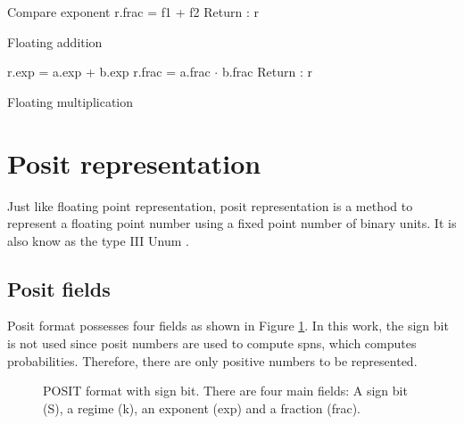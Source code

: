 \begin{algorithm}[H]
\SetAlgoLined
{}
Compare exponent\;
r.frac = f1 + f2\;
Return : r\;
\caption{Floating addition}
\label{alg:float_add}
\end{algorithm}

\begin{algorithm}[H]
\SetAlgoLined
{}
r.exp = a.exp + b.exp\;
r.frac = a.frac $\cdot$ b.frac\;
Return : r\;
\caption{Floating multiplication}
\label{alg:float_mult}
\end{algorithm}


\section{Posit representation}

Just like floating point representation, posit representation is a method to represent a floating point number using a fixed point number of binary units. It is also know as the type III \gls{Unum} \cite{unum_wiki}.

\subsection{Posit fields}

Posit format possesses four fields as shown in Figure \ref{fig:posit_shema}. In this work, the sign bit is not used since posit numbers are used to compute \glspl{spn}, which computes probabilities. Therefore, there are only positive numbers to be represented.

\begin{figure}[!ht]
\begin{mdframed}
\centering

\caption{POSIT format with sign bit. There are four main fields: A sign bit (S), a regime (k), an exponent (exp) and a fraction (frac).}
\label{fig:posit_shema}
\end{mdframed}
\end{figure}


